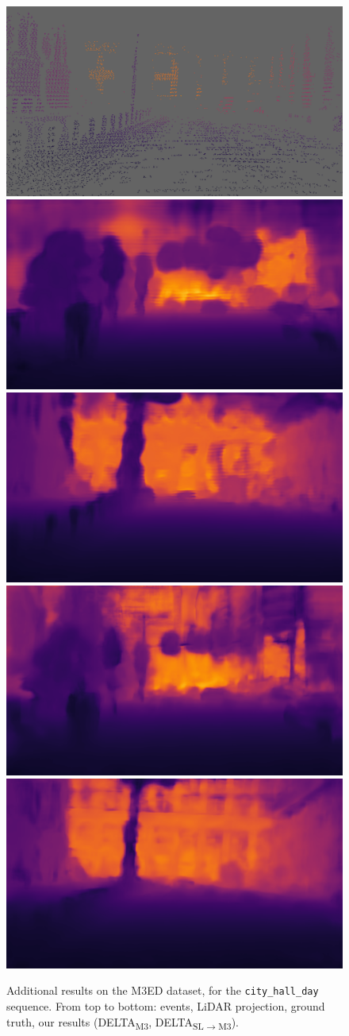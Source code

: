 \begin{figure}
  \includegraphics[width=0.4325\linewidth]{mainmatter/figures/c_depth_transf/m3ed_dense_cmp_additional/gtbf001921_lightgray_fixed.png}\\
  \includegraphics[width=0.4325\linewidth]{mainmatter/figures/c_depth_transf/m3ed_dense_cmp_additional/predbf000164_m3.png}
  \includegraphics[width=0.4325\linewidth]{mainmatter/figures/c_depth_transf/m3ed_dense_cmp_additional/predbf001921_m3.png}\\
  \includegraphics[width=0.4325\linewidth]{mainmatter/figures/c_depth_transf/m3ed_dense_cmp_additional/predbf000164_sl_m3.png}
  \includegraphics[width=0.4325\linewidth]{mainmatter/figures/c_depth_transf/m3ed_dense_cmp_additional/predbf001921_sl_m3.png}
  \cprotect\caption{Additional results on the M3ED dataset, for the \verb|city_hall_day| sequence. From top to bottom: events, LiDAR projection, ground truth, our results (DELTA\textsubscript{M3}, DELTA\textsubscript{SL\(\rightarrow\)M3}).}\label{fig:appendix:delta:cmp_m3ed_additional_day}
\end{figure}

